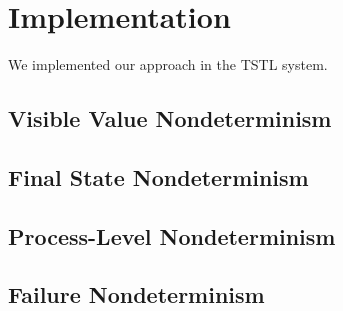 \section{Implementation}

We implemented our approach in the TSTL \cite{NFM15} system.

\subsection{Visible Value Nondeterminism}

\subsection{Final State Nondeterminism}

\subsection{Process-Level Nondeterminism}

\subsection{Failure Nondeterminism}